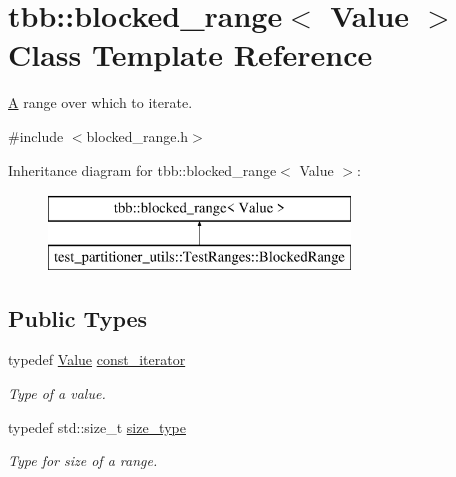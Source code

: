 \hypertarget{classtbb_1_1blocked__range}{}\section{tbb\+:\+:blocked\+\_\+range$<$ Value $>$ Class Template Reference}
\label{classtbb_1_1blocked__range}


\hyperlink{structA}{A} range over which to iterate.  




{\ttfamily \#include $<$blocked\+\_\+range.\+h$>$}

Inheritance diagram for tbb\+:\+:blocked\+\_\+range$<$ Value $>$\+:\begin{figure}[H]
\begin{center}
\leavevmode
\includegraphics[height=2.000000cm]{classtbb_1_1blocked__range}
\end{center}
\end{figure}
\subsection*{Public Types}
\begin{DoxyCompactItemize}
\item 
typedef \hyperlink{structValue}{Value} \hyperlink{classtbb_1_1blocked__range_ad56ca70af46acf8870b4970d8a809791}{const\+\_\+iterator}
\begin{DoxyCompactList}\small\item\em Type of a value. \end{DoxyCompactList}\item 
\hypertarget{classtbb_1_1blocked__range_a89b300cecd9d617e4ee801c786756e55}{}typedef std\+::size\+\_\+t \hyperlink{classtbb_1_1blocked__range_a89b300cecd9d617e4ee801c786756e55}{size\+\_\+type}\label{classtbb_1_1blocked__range_a89b300cecd9d617e4ee801c786756e55}

\begin{DoxyCompactList}\small\item\em Type for size of a range. \end{DoxyCompactList}\end{DoxyCompactItemize}

